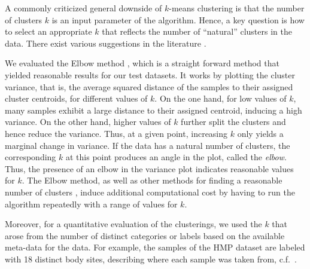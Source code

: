 A commonly criticized general downside of $k$-means clustering is
that the number of clusters $k$ is an input parameter of the algorithm.
Hence, a key question is how to select an appropriate $k$
that reflects the number of ``natural'' clusters in the data.
There exist various suggestions in the literature
\cite{Thorndike1953,Rousseeuw1987,Bischof1999,Pelleg2000,Tibshirani2001,Hamerly2004}.

We evaluated the Elbow method \cite{Thorndike1953},
which is a straight forward method that yielded reasonable results for our test datasets.
It works by plotting the cluster variance,
that is, the average squared distance of the samples to their assigned cluster centroids,
for different values of $k$.
On the one hand, for low values of $k$, many samples exhibit a large distance to their assigned centroid,
inducing a high variance.
On the other hand, higher values of $k$ further split the clusters and hence reduce the variance.
Thus, at a given point, increasing $k$ only yields a marginal change in variance.
If the data has a natural number of clusters, the corresponding $k$ at this point produces an angle in the plot,
called the \emph{elbow}.
Thus, the presence of an elbow in the variance plot indicates reasonable values for $k$.
The Elbow method, as well as other methods for finding a reasonable number of clusters \cite{Rousseeuw1987},
induce additional computational cost by having to run the algorithm repeatedly with a range of values for $k$.

Moreover, for a quantitative evaluation of the clusterings,
we used the $k$ that arose from the number of distinct categories or labels based on the available meta-data for the data.
For example, the samples of the \ac{HMP} dataset are labeled with \num{18} distinct body sites,
describing where each sample was taken from, c.f.~.


